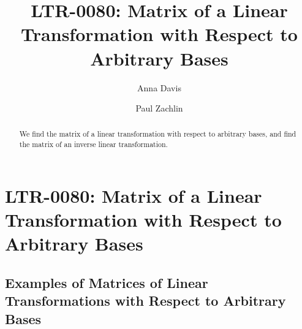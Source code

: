 \documentclass{ximera}
\author{Anna Davis \and Paul Zachlin} \title{LTR-0080: Matrix of a Linear Transformation with Respect to Arbitrary Bases} \license{CC-BY 4.0}
\begin{document}
\begin{abstract}
  We find the matrix of a linear transformation with respect to arbitrary bases, and find the matrix of an inverse linear transformation.
\end{abstract}
\maketitle

\section*{LTR-0080: Matrix of a Linear Transformation with Respect to Arbitrary Bases}
\subsection*{Examples of Matrices of Linear Transformations with Respect to  Arbitrary Bases}
\end{document}
